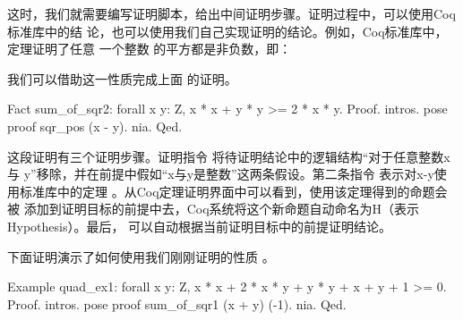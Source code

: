 \documentclass{article}[margin=1pt]
\theoremstyle{definition}
\begin{document}
 这时，我们就需要编写证明脚本，给出中间证明步骤。证明过程中，可以使用Coq标准库中的结
    论，也可以使用我们自己实现证明的结论。例如，Coq标准库中，  定理证明了任意
    一个整数  的平方都是非负数，即：
\begin{quotation}


\end{quotation}
 我们可以借助这一性质完成上面  的证明。

\begin{mytext8}
Fact sum_of_sqr2: forall x y: Z,
  x * x + y * y >= 2 * x * y.
Proof.
  intros.
  pose proof sqr_pos (x - y).
  nia.
Qed.



\end{mytext8}
\noindent
 这段证明有三个证明步骤。证明指令  将待证明结论中的逻辑结构“对于任意整数x与
    y”移除，并在前提中假如“x与y是整数”这两条假设。第二条指令  表示对x-y使
    用标准库中的定理  。从Coq定理证明界面中可以看到，使用该定理得到的命题会被
    添加到证明目标的前提中去，Coq系统将这个新命题自动命名为H（表示Hypothesis）。最后，
      可以自动根据当前证明目标中的前提证明结论。

 下面证明演示了如何使用我们刚刚证明的性质  。

\begin{mytext9}
Example quad_ex1: forall x y: Z,
  x * x + 2 * x * y + y * y + x + y + 1 >= 0.
Proof.
  intros.
  pose proof sum_of_sqr1 (x + y) (-1).
  nia.
Qed.


\end{mytext9}
\noindent
\end{document}
